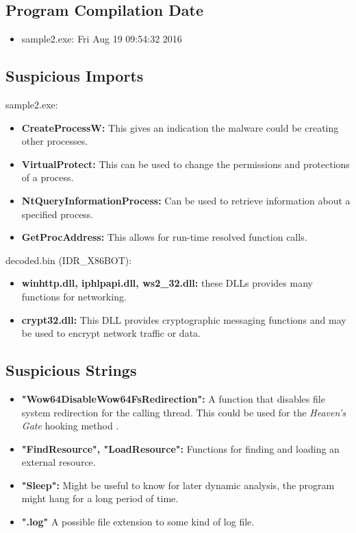 \documentclass{article}
\begin{document}
    \subsection{Program Compilation Date}
    \begin{itemize}
        \item sample2.exe: Fri Aug 19 09:54:32 2016
    \end{itemize}

    \subsection{Suspicious Imports}
    sample2.exe:
    \begin{itemize}
        \item \textbf{CreateProcessW:} This gives an indication the malware could be creating other processes.
        \item \textbf{VirtualProtect:} This can be used to change the permissions and protections of a process.
        \item \textbf{NtQueryInformationProcess:} Can be used to retrieve information about a specified process.
        \item \textbf{GetProcAddress:} This allows for run-time resolved function calls.
    \end{itemize}
    decoded.bin (IDR{\_}X86BOT):

    \begin{itemize}
        \item \textbf{winhttp.dll, iphlpapi.dll, ws2{\_}32.dll:} these DLLs provides many functions for networking.
        \item \textbf{crypt32.dll:} This DLL provides cryptographic messaging functions and may be used to encrypt network traffic or data.
    \end{itemize}

    \subsection{Suspicious Strings}
    \begin{itemize}
        \item \textbf{"Wow64DisableWow64FsRedirection":} A function that disables file system redirection for the calling thread. This could be used for the \textit{Heaven's Gate} hooking method \cite{Wow64}.
        \item \textbf{"FindResource", "LoadResource":} Functions for finding and loading an external resource.
        \item \textbf{"Sleep":} Might be useful to know for later dynamic analysis, the program might hang for a long period of time.
        \item \textbf{".log"} A possible file extension to some kind of log file.
    \end{itemize}
\end{document}
